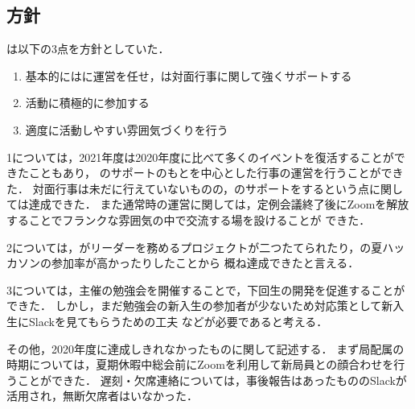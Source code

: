 \subsection*{\newGradeIfKouki{}\thirdGrade{}方針}


\thirdGrade{}は以下の3点を方針としていた．

\begin{enumerate}
    \item 基本的には\secondGrade{}に運営を任せ，\thirdGrade{}は対面行事に関して強くサポートする
    \item 活動に積極的に参加する
    \item 適度に活動しやすい雰囲気づくりを行う
\end{enumerate}


1については，2021年度は2020年度に比べて多くのイベントを復活することができたこともあり，
\thirdGrade{}のサポートのもと\secondGrade{}を中心とした行事の運営を行うことができた．
対面行事は未だに行えていないものの，\secondGrade{}のサポートをするという点に関しては達成できた．
また通常時の運営に関しては，定例会議終了後にZoomを解放することでフランクな雰囲気の中で交流する場を設けることが
できた．

2については，\thirdGrade{}がリーダーを務めるプロジェクトが二つたてられたり，\thirdGrade{}の夏ハッカソンの参加率が高かったりしたことから
概ね達成できたと言える．

3については，\thirdGrade{}主催の勉強会を開催することで，下回生の開発を促進することができた．
しかし，まだ勉強会の新入生の参加者が少ないため対応策として新入生にSlackを見てもらうための工夫
などが必要であると考える．

その他，2020年度に達成しきれなかったものに関して記述する．
まず局配属の時期については，夏期休暇中総会前にZoomを利用して新局員との顔合わせを行うことができた．
遅刻・欠席連絡については，事後報告はあったもののSlackが活用され，無断欠席者はいなかった．


